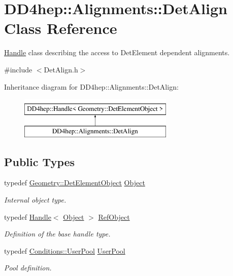 \hypertarget{class_d_d4hep_1_1_alignments_1_1_det_align}{}\section{D\+D4hep\+:\+:Alignments\+:\+:Det\+Align Class Reference}
\label{class_d_d4hep_1_1_alignments_1_1_det_align}


\hyperlink{class_d_d4hep_1_1_handle}{Handle} class describing the access to Det\+Element dependent alignments.  




{\ttfamily \#include $<$Det\+Align.\+h$>$}

Inheritance diagram for D\+D4hep\+:\+:Alignments\+:\+:Det\+Align\+:\begin{figure}[H]
\begin{center}
\leavevmode
\includegraphics[height=2.000000cm]{class_d_d4hep_1_1_alignments_1_1_det_align}
\end{center}
\end{figure}
\subsection*{Public Types}
\begin{DoxyCompactItemize}
\item 
typedef \hyperlink{class_d_d4hep_1_1_geometry_1_1_det_element_object}{Geometry\+::\+Det\+Element\+Object} \hyperlink{class_d_d4hep_1_1_alignments_1_1_det_align_ae49c039feb46ce85c64fecb6cf669f45}{Object}
\begin{DoxyCompactList}\small\item\em Internal object type. \end{DoxyCompactList}\item 
typedef \hyperlink{class_d_d4hep_1_1_handle}{Handle}$<$ \hyperlink{class_d_d4hep_1_1_alignments_1_1_det_align_ae49c039feb46ce85c64fecb6cf669f45}{Object} $>$ \hyperlink{class_d_d4hep_1_1_alignments_1_1_det_align_aefb28d8de174c8d7efe86b45829701ff}{Ref\+Object}
\begin{DoxyCompactList}\small\item\em Definition of the base handle type. \end{DoxyCompactList}\item 
typedef \hyperlink{class_d_d4hep_1_1_conditions_1_1_user_pool}{Conditions\+::\+User\+Pool} \hyperlink{class_d_d4hep_1_1_alignments_1_1_det_align_a0595e4c0ee7f454cf5e9c5d32b718aca}{User\+Pool}
\begin{DoxyCompactList}\small\item\em Pool definition. \end{DoxyCompactList}\end{DoxyCompactItemize}
